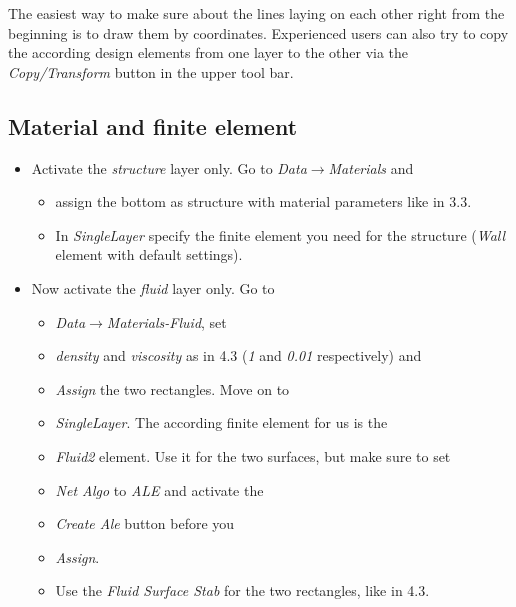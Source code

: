 The easiest way to make sure about the lines laying on each other
right from the beginning is to draw them by coordinates. Experienced
users can also try to copy the according design elements from one
layer to the other via the \emph{Copy/Transform} button in the upper
tool bar. 


\subsection{Material and finite element}

\begin{itemize}
\item Activate the \emph{structure} layer only. Go to \emph{Data$\to$Materials}
and 

\begin{itemize}
\item assign the bottom as structure with material parameters like in 3.3. 
\item In \emph{SingleLayer} specify the finite element you need for the
structure (\emph{Wall} element with default settings).
\end{itemize}
\item Now activate the \emph{fluid} layer only. Go to 

\begin{itemize}
\item \emph{Data$\to$Materials-Fluid}, set 
\item \emph{density} and \emph{viscosity} as in 4.3 (\emph{1} and \emph{0.01} respectively) and 
\item \emph{Assign} the two rectangles. Move on to 
\item \emph{SingleLayer}. The according finite element for us is the 
\item \emph{Fluid2} element. Use it for the two surfaces, but make sure
to set 
\item \emph{Net Algo} to \emph{ALE} and activate the 
\item \emph{Create Ale} button before you 
\item \emph{Assign}. 
\item Use the \emph{Fluid Surface Stab} for the two rectangles, like in
4.3.
\end{itemize}



\end{itemize}
